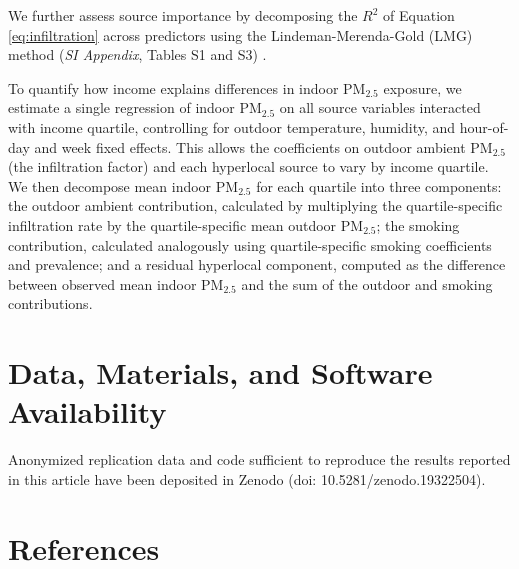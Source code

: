 \documentclass[9pt,twocolumn,twoside]{pnas-new}
\begin{document}
We further assess source importance by decomposing the $R^2$ of Equation \ref{eq:infiltration} across predictors using the Lindeman-Merenda-Gold (LMG) method (\textit{SI Appendix}, Tables S1 and S3) \citep{lindeman_introduction_1980, gromping_relative_2006}.


To quantify how income explains differences in indoor PM$_{2.5}$ exposure, we estimate a single regression of indoor PM$_{2.5}$ on all source variables interacted with income quartile, controlling for outdoor temperature, humidity, and hour-of-day and week fixed effects. This allows the coefficients on outdoor ambient PM$_{2.5}$ (the infiltration factor) and each hyperlocal source to vary by income quartile. We then decompose mean indoor PM$_{2.5}$ for each quartile into three components: the outdoor ambient contribution, calculated by multiplying the quartile-specific infiltration rate by the quartile-specific mean outdoor PM$_{2.5}$; the smoking contribution, calculated analogously using quartile-specific smoking coefficients and prevalence; and a residual hyperlocal component, computed as the difference between observed mean indoor PM$_{2.5}$ and the sum of the outdoor and smoking contributions.


\showacknow{}
\vspace{0.5cm}
\section*{Data, Materials, and Software Availability}
Anonymized replication data and code sufficient to reproduce the results reported in this article have been deposited in Zenodo \citep{sun_sorin_suryadarma_rahut_resosudarmo_2026} (doi: 10.5281/zenodo.19322504).

\vspace{1cm}
\section*{References}




\end{document}

